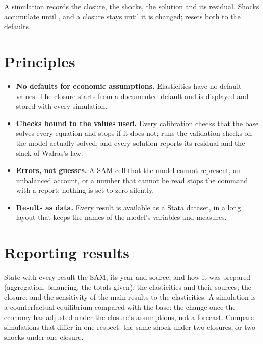 A simulation records the closure, the shocks, the solution and its residual.
Shocks accumulate until , and a closure stays until it
is changed;  resets both to the defaults.

\section{Principles}

\begin{itemize}
\item \textbf{No defaults for economic assumptions.} Elasticities have no
default values. The closure starts from a documented default and is
displayed and stored with every simulation.
\item \textbf{Checks bound to the values used.} Every calibration checks that
the base solves every equation and stops if it does not; 
runs the validation checks on the model actually solved; and every solution
reports its residual and the slack of Walras's law.
\item \textbf{Errors, not guesses.} A SAM cell that the model cannot represent,
an unbalanced account, or a number that cannot be read stops the command with
a report; nothing is set to zero silently.
\item \textbf{Results as data.} Every result is available as a Stata dataset,
in a long layout that keeps the names of the model's variables and
measures.
\end{itemize}

\section{Reporting results}

State with every result the SAM, its year and source, and how it was prepared
(aggregation, balancing, the totals given); the elasticities and their
sources; the closure; and the sensitivity of the main results to the
elasticities. A simulation is a counterfactual equilibrium compared with the
base: the change once the economy has adjusted under the closure's
assumptions, not a forecast. Compare simulations that differ in one respect:
the same shock under two closures, or two shocks under one closure.
